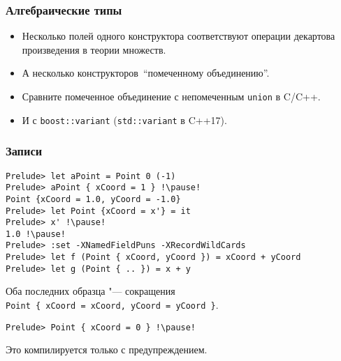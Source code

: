 \documentclass[10pt]{beamer}
\begin{document}
\begin{frame}[fragile]
\frametitle{Алгебраические типы}
\begin{itemize}
    \item Несколько полей одного конструктора соответствуют операции декартова произведения в теории множеств.
    \item А несколько конструкторов\pause\ \enquote{помеченному объединению}.
    \item Сравните помеченное объединение с непомеченным \lstinline|union| в C/C++.
    \item И с \lstinline|boost::variant| (\lstinline|std::variant| в C++17).
\end{itemize}
\end{frame}




\begin{frame}[fragile]
\frametitle{Записи}\hypertarget{rec2}{}
\hyperlink{rec1}{}
\begin{lstlisting}[basicstyle=\ttfamily\small]
Prelude> let aPoint = Point 0 (-1)
Prelude> aPoint { xCoord = 1 } !\pause!
Point {xCoord = 1.0, yCoord = -1.0}
Prelude> let Point {xCoord = x'} = it
Prelude> x' !\pause!
1.0 !\pause!
Prelude> :set -XNamedFieldPuns -XRecordWildCards
Prelude> let f (Point { xCoord, yCoord }) = xCoord + yCoord
Prelude> let g (Point { .. }) = x + y
\end{lstlisting}
Оба последних образца "--- сокращения\\ \lstinline[basicstyle=\ttfamily\small]|Point { xCoord = xCoord, yCoord = yCoord }|.
\begin{lstlisting}[basicstyle=\ttfamily\small]
Prelude> Point { xCoord = 0 } !\pause!
\end{lstlisting}
Это компилируется только с предупреждением.
\end{frame}
\end{document}
